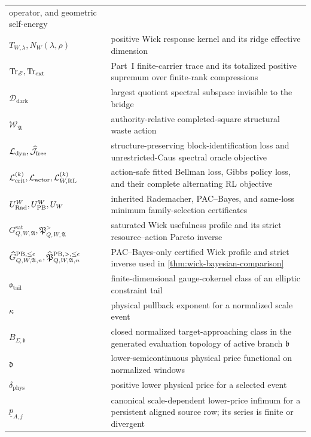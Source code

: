 \documentclass[11pt]{article}
\numberwithin{section}{part}
\theoremstyle{plain}
\theoremstyle{definition}
\theoremstyle{remark}
\newcommand{\Phys}{\mathrm{phys}}
\begin{document}
\begin{longtable}{p{.22\linewidth}p{.68\linewidth}}
operator, and geometric self-energy\\
\(T_{W,\lambda},N_W(\lambda,\rho)\) & positive Wick response kernel and its
ridge effective dimension\\
\(\operatorname{Tr}_{\mathscr E},\operatorname{Tr}_{\rm ext}\) & Part~I
finite-carrier trace and its totalized positive supremum over finite-rank
compressions\\
\(\mathcal D_{\mathrm{dark}}\) & largest quotient spectral subspace invisible
to the bridge\\
\(\mathscr W_{\mathfrak A}\) & authority-relative completed-square structural
waste action\\
\(\mathcal L_{\rm dyn},\widehat{\mathcal J}_{\rm free}\) &
structure-preserving block-identification loss and unrestricted-Caus
spectral oracle objective\\
\(\mathcal L_{\rm crit}^{(k)},\mathcal L_{\rm actor},
\mathcal L_{W,{\rm RL}}^{(k)}\) & action-safe fitted Bellman loss, Gibbs
policy loss, and their complete alternating RL objective\\
\(U_{\rm Rad}^W,U_{\rm PB}^W,U_W\) & inherited Rademacher, PAC--Bayes, and
same-loss minimum family-selection certificates\\
\(G_{Q,W,\mathfrak A}^{\mathrm{sat}},
\mathfrak P_{Q,W,\mathfrak A}^{>}\) & saturated Wick usefulness profile and
its strict resource--action Pareto inverse\\
\(\widehat G_{Q,W,\mathfrak A,n}^{\rm PB,\le\epsilon},
\widehat{\mathfrak P}_{Q,W,\mathfrak A,n}^{\rm PB,>,\le\epsilon}\) &
PAC--Bayes-only certified Wick profile and strict inverse used in
\cref{thm:wick-bayesian-comparison}\\
\(\mathfrak o_{\mathrm{tail}}\) & finite-dimensional gauge-cokernel class of
an elliptic constraint tail\\
\(\kappa\) & physical pullback exponent for a normalized scale event\\
\(B_{\Sigma,\mathfrak b}\) & closed normalized target-approaching class in
the generated evaluation topology of active branch \(\mathfrak b\)\\
\(\mathfrak d\) & lower-semicontinuous physical price functional on normalized
windows\\
\(\delta_{\Phys}\) & positive lower physical price for a selected event\\
\(\underline p_{A,j}\) & canonical scale-dependent lower-price infimum for a
persistent aligned source row; its series is finite or divergent\\

\end{longtable}
\end{document}
